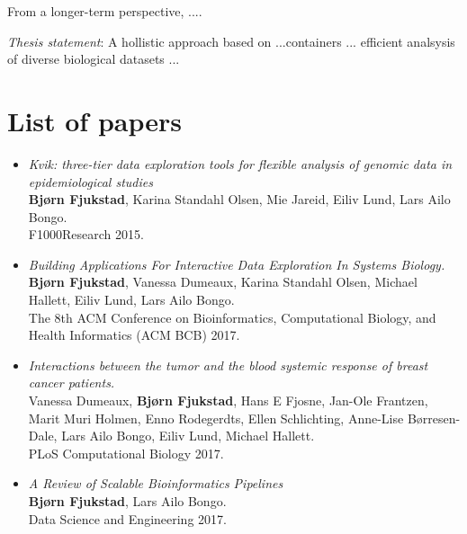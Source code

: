 From a longer-term perspective, ....

\emph{Thesis statement}:
A hollistic approach based on ...containers ... efficient analsysis of diverse
biological datasets ... 


\section{List of papers} 
\begin{itemize}
    \item
        \emph{Kvik: three-tier data exploration tools for flexible analysis of
        genomic data in epidemiological studies}
        \\
        \textbf{Bjørn Fjukstad}, Karina Standahl Olsen, Mie Jareid, Eiliv Lund,
        Lars Ailo Bongo. 
        \\ 
        F1000Research 2015.
        
    \item 
        \emph{Building Applications For Interactive Data Exploration In Systems
        Biology.}
        \\
        \textbf{Bjørn Fjukstad}, Vanessa Dumeaux, Karina Standahl Olsen, Michael
        Hallett, Eiliv Lund, Lars Ailo Bongo.  
        \\ 
        The 8th ACM Conference on Bioinformatics, Computational Biology, and
        Health Informatics (ACM BCB) 2017.

    \item 
        \emph{Interactions between the tumor and the blood systemic response of
        breast cancer patients.}
        \\ 
        Vanessa Dumeaux, \textbf{Bjørn Fjukstad}, Hans E Fjosne, Jan-Ole
        Frantzen, Marit Muri Holmen, Enno Rodegerdts, Ellen Schlichting,
        Anne-Lise Børresen-Dale, Lars Ailo Bongo, Eiliv Lund, Michael Hallett.
        \\ 
        PLoS Computational Biology 2017.

    \item \emph{A Review of Scalable Bioinformatics Pipelines} 
        \\
        \textbf{Bjørn Fjukstad}, Lars Ailo Bongo.
        \\ 
        Data Science and Engineering 2017.


\end{itemize}
